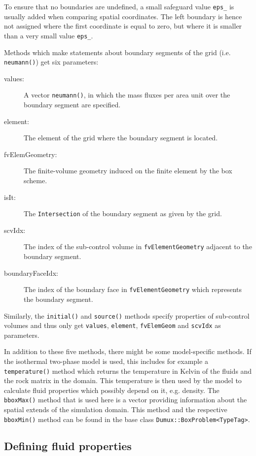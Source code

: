 To ensure that no boundaries are undefined, a small safeguard value \texttt{eps\_}
is usually added when comparing spatial coordinates. The left boundary is
hence not assigned where the first coordinate is equal to zero, but where it is
smaller than a very small value \texttt{eps\_}.

Methods which make statements about boundary segments of the grid (i.e. 
\texttt{neumann()}) get six parameters:
\begin{description}
\item[values:] A vector \texttt{neumann()}, in which the mass fluxes per area unit
  over the boundary segment are specified.
\item[element:] The element of the grid where the boundary segment
  is located.
\item[fvElemGeometry:] The finite-volume geometry induced on the
  finite element by the box scheme.
\item[isIt:] The \texttt{Intersection} of the boundary segment as given by the grid.
\item[scvIdx:] The index of the sub-control volume in
  \texttt{fvElementGeometry} adjacent to the boundary segment.
\item[boundaryFaceIdx:] The index of the boundary face in
  \texttt{fvElementGeometry} which represents the boundary segment.  
\end{description}

Similarly, the \texttt{initial()} and \texttt{source()} methods
specify properties of sub-control volumes and thus only get
\texttt{values}, \texttt{element}, \texttt{fvElemGeom} and
\texttt{scvIdx} as parameters.

In addition to these five methods, there might be some model-specific
methods. If the isothermal two-phase model is used, this includes 
for example a \texttt{temperature()} method which returns the temperature in Kelvin
of the fluids and the rock matrix in the domain. This temperature is
then used by the model to calculate fluid properties which possibly
depend on it, e.g. density. The \texttt{bboxMax()} method that is used here is a vector
providing information about the spatial extends of the simulation domain. This method 
and the respective \texttt{bboxMin()} method
can be found in the base class \texttt{Dumux::BoxProblem<TypeTag>}.


\subsection{Defining fluid properties}\label{tutorial-coupled:description-fluid-class}

